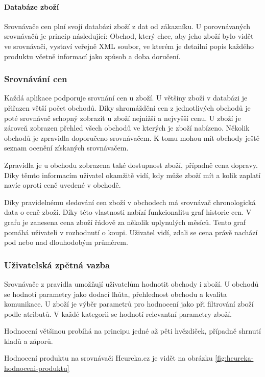 \paragraph{Databáze zboží}
Srovnávače cen plní svojí databázi zboží z dat od zákazníku. U porovnávaných srovnávačů je princip následující: Obchod, který chce, aby jeho zboží bylo vidět ve srovnávači, vystaví veřejně XML soubor, ve kterém je detailní popis každého produktu včetně informací jako způsob a doba doručení.\cite{website:heureka:registrace-obchodu}

\subsubsection{Srovnávání cen}
Každá aplikace podporuje srovnání cen u zboží. U většiny zboží v databázi je přiřazen větší počet obchodů. Díky shromáždění cen z jednotlivých obchodů je poté srovnávač schopný zobrazit u zboží nejnižší a nejvyšší cenu. U zboží je zároveň zobrazen přehled všech obchodů ve kterých je zboží nabízeno. Několik obchodů je zpravidla doporučeno srovnávačem. K tomu mohou mít obchody ještě seznam ocenění získaných srovnávačem.

Zpravidla je u obchodu zobrazena také dostupnost zboží, případně cena dopravy. Díky těmto informacím uživatel okamžitě vidí, kdy může zboží mít a kolik zaplatí navíc oproti ceně uvedené v obchodě.

Díky pravidelnému sledování cen zboží v obchodech má srovnávač chronologická data o ceně zboží. Díky této vlastnosti nabízí funkcionalitu graf historie cen. V grafu je zanesena cena zboží řádově za několik uplynulých měsíců. Tento graf pomáhá uživateli v rozhodnutí o koupi. Uživatel vidí, zdali se cena právě nachází pod nebo nad dlouhodobým průměrem.

\subsubsection{Uživatelská zpětná vazba}
Srovnávače z pravidla umožňují uživatelům hodnotit obchody i zboží. U obchodů se hodnotí parametry jako dodací lhůta, přehlednost obchodu a kvalita komunikace. U zboží je výběr parametrů pro hodnocení jako při filtrování zboží podle atributů. V každé kategorii se hodnotí relevantní parametry zboží. 

Hodnocení většinou probíhá na principu jedné až pěti hvězdiček, případně shrnutí kladů a záporů.

Hodnocení produktu na srovnávači Heureka.cz je vidět na obrázku \ref{fig:heureka-hodnoceni-produktu}

